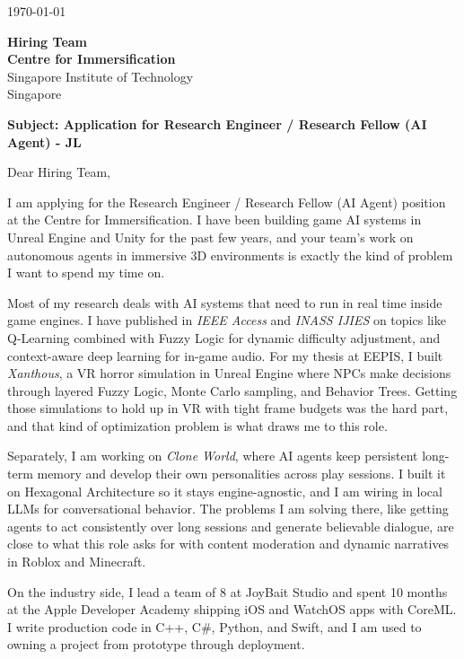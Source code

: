 \documentclass[10pt,a4paper]{article}
\begin{document}
\vspace{1em}
\noindent \today
\vspace{1em}

\noindent \textbf{Hiring Team} \\
\textbf{Centre for Immersification} \\
Singapore Institute of Technology \\
Singapore

\vspace{0.7em}
\noindent \textbf{Subject: Application for Research Engineer / Research Fellow (AI Agent) - JL}
\vspace{0.7em}

\noindent Dear Hiring Team,

\vspace{1em}
\noindent I am applying for the Research Engineer / Research Fellow (AI Agent) position at the Centre for Immersification. I have been building game AI systems in Unreal Engine and Unity for the past few years, and your team’s work on autonomous agents in immersive 3D environments is exactly the kind of problem I want to spend my time on.

\vspace{1em}
\noindent Most of my research deals with AI systems that need to run in real time inside game engines. I have published in \textit{IEEE Access} and \textit{INASS IJIES} on topics like Q-Learning combined with Fuzzy Logic for dynamic difficulty adjustment, and context-aware deep learning for in-game audio. For my thesis at EEPIS, I built \textit{Xanthous}, a VR horror simulation in Unreal Engine where NPCs make decisions through layered Fuzzy Logic, Monte Carlo sampling, and Behavior Trees. Getting those simulations to hold up in VR with tight frame budgets was the hard part, and that kind of optimization problem is what draws me to this role.

\vspace{1em}
\noindent Separately, I am working on \textit{Clone World}, where AI agents keep persistent long-term memory and develop their own personalities across play sessions. I built it on Hexagonal Architecture so it stays engine-agnostic, and I am wiring in local LLMs for conversational behavior. The problems I am solving there, like getting agents to act consistently over long sessions and generate believable dialogue, are close to what this role asks for with content moderation and dynamic narratives in Roblox and Minecraft.

\vspace{1em}
\noindent On the industry side, I lead a team of 8 at JoyBait Studio and spent 10 months at the Apple Developer Academy shipping iOS and WatchOS apps with CoreML. I write production code in C++, C\#, Python, and Swift, and I am used to owning a project from prototype through deployment.
\end{document}
